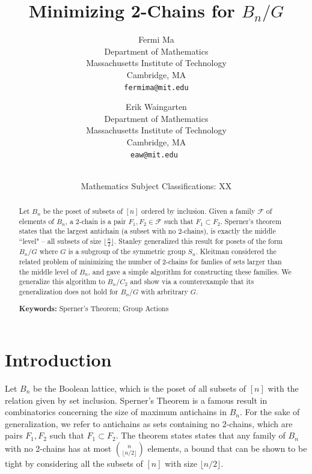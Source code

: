\documentclass[12pt]{article}
\title{\bf Minimizing 2-Chains for $B_n/G$}
\author{
Fermi Ma\\
\small Department of Mathematics\\[-0.8ex]
\small Massachusetts Institute of Technology\\[-0.8ex]
\small Cambridge, MA\\
\small\tt fermima@mit.edu\\
\and
Erik Waingarten\\
\small Department of Mathematics\\[-0.8ex]
\small Massachusetts Institute of Technology\\[-0.8ex] 
\small Cambridge, MA\\
\small\tt eaw@mit.edu
}
\date{\dateline{August, 2014}{XX}\\
\small Mathematics Subject Classifications: XX}
\theoremstyle{plain}
\theoremstyle{definition}
\theoremstyle{remark}
\newcommand{\F}{\mathcal{F}}
\begin{document}
\maketitle


\begin{abstract}
Let $B_n$ be the poset of subsets of $[n]$ ordered by inclusion. Given a family $\F$ of elements of $B_n$, a 2-chain is a pair $F_1, F_2 \in \F$ such that $F_1 \subset F_2$. Sperner's theorem states that the largest antichain (a subset with no 2-chains), is exactly the middle ``level" -- all subsets of size $\lfloor \frac{n}{2} \rfloor$. Stanley generalized this result for posets of the form $B_n/G$ where $G$ is a subgroup of the symmetric group $S_n$. Kleitman considered the related problem of minimizing the number of 2-chains for famlies of sets larger than the middle level of $B_n$, and gave a simple algorithm for constructing these families. We generalize this algorithm to $B_n/C_2$ and show via a counterexample that its generalization does not hold for $B_n/G$ with arbritrary $G$.

  \bigskip\noindent \textbf{Keywords:} Sperner's Theorem; Group Actions\end{abstract}

\section{Introduction}

Let $B_n$ be the Boolean lattice, which is the poset of all subsets of $[n]$ with the relation given by set inclusion. Sperner's Theorem is a famous result in combinatorics concerning the size of maximum antichains in $B_n$. For the sake of generalization, we refer to antichains as sets containing no 2-chains, which are pairs $F_1, F_2$ such that $F_1 \subset F_2$. The theorem states states that any family of $B_n$ with no 2-chains has at most $\binom{n}{\lfloor n/2 \rfloor}$ elements, a bound that can be shown to be tight by considering all the subsets of $[n]$ with size $\lfloor n/2 \rfloor$.
\end{document}
